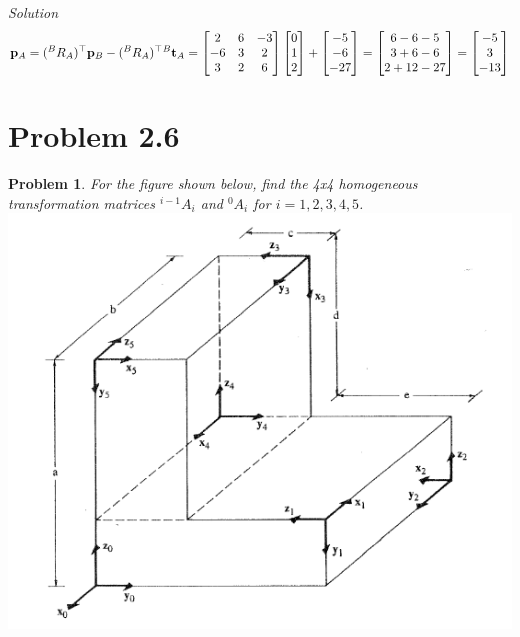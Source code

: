 \documentclass{article}
\newtheorem{prob}{Problem}
\numberwithin{prob}{section}
\newenvironment{solution}{\emph{Solution}}{}
\begin{document}
\begin{solution}
\begin{align}
  \mathbf{p}_A = ({}^BR_A)^\top \mathbf{p}_B - ({}^BR_A)^\top {}^B\mathbf{t}_A 
  = \begin{bmatrix}
    2 & 6 & -3 \\
    -6 & 3 & 2\\
    3 & 2 & 6
  \end{bmatrix}
  \begin{bmatrix} 0 \\ 1 \\ 2 \end{bmatrix}
  +
  \begin{bmatrix} -5\\ -6\\ -27\end{bmatrix}
  = 
  \begin{bmatrix} 6-6-5\\ 3 +6-6 \\ 2+12-27 \end{bmatrix}
  = 
  \begin{bmatrix} -5\\ 3  \\ -13 \end{bmatrix}
\end{align}

\end{solution}
\section{Problem 2.6}
\begin{prob}
  For the figure shown below, find the 4x4 homogeneous transformation matrices $^{i-1}A_i$ and $^0A_i$ for $i=1,2,3,4,5$.\\
  \includegraphics[width=0.5\linewidth]{media/hw3.2.6.png}
\end{prob}
\end{document}
